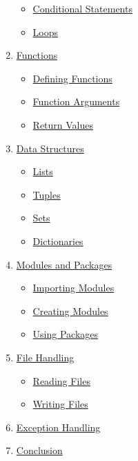 \documentclass[
  letterpaper,
  DIV=11,
  numbers=noendperiod]{scrreprt}
\providecommand{\tightlist}{%
  \setlength{\itemsep}{0pt}\setlength{\parskip}{0pt}}\usepackage{longtable,booktabs,array}
\begin{document}
\begin{enumerate}
  \begin{itemize}
  \tightlist
  \item
    \hyperref[conditional-statements]{Conditional Statements}
  \item
    \hyperref[loops]{Loops}
  \end{itemize}
\item
  \hyperref[functions]{Functions}

  \begin{itemize}
  \tightlist
  \item
    \hyperref[defining-functions]{Defining Functions}
  \item
    \hyperref[function-arguments]{Function Arguments}
  \item
    \hyperref[return-values]{Return Values}
  \end{itemize}
\item
  \hyperref[data-structures]{Data Structures}

  \begin{itemize}
  \tightlist
  \item
    \hyperref[lists]{Lists}
  \item
    \hyperref[tuples]{Tuples}
  \item
    \hyperref[sets]{Sets}
  \item
    \hyperref[dictionaries]{Dictionaries}
  \end{itemize}
\item
  \hyperref[modules-and-packages]{Modules and Packages}

  \begin{itemize}
  \tightlist
  \item
    \hyperref[importing-modules]{Importing Modules}
  \item
    \hyperref[creating-modules]{Creating Modules}
  \item
    \hyperref[using-packages]{Using Packages}
  \end{itemize}
\item
  \hyperref[file-handling]{File Handling}

  \begin{itemize}
  \tightlist
  \item
    \hyperref[reading-files]{Reading Files}
  \item
    \hyperref[writing-files]{Writing Files}
  \end{itemize}
\item
  \hyperref[exception-handling]{Exception Handling}
\item
  \hyperref[conclusion]{Conclusion}
\end{enumerate}
\end{document}
